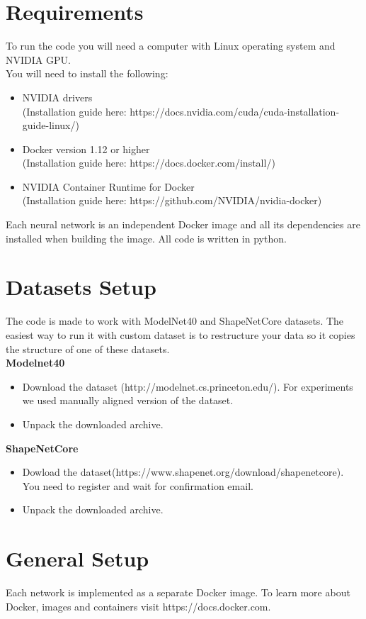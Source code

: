 \section{Requirements}
To run the code you will need a computer with Linux operating system and NVIDIA GPU. \\

You will need to install the following:
\begin{itemize}
	\item NVIDIA drivers \\(Installation guide here: https://docs.nvidia.com/cuda/cuda-installation-guide-linux/)
	\item Docker version 1.12 or higher \\(Installation guide here: https://docs.docker.com/install/)
	\item NVIDIA Container Runtime for Docker \\(Installation guide here: https://github.com/NVIDIA/nvidia-docker)
\end{itemize}
Each neural network is an independent Docker image and all its dependencies are installed when building the image. All code is written in python.  

\section{Datasets Setup}
The code is made to work with ModelNet40 and ShapeNetCore datasets. The easiest way to run it with custom dataset is to restructure your data so it copies the structure of one of these datasets.\\
\textbf{Modelnet40}
\begin{itemize}
	\item {Download the dataset (http://modelnet.cs.princeton.edu/). For experiments we used manually aligned version of the dataset.}
	\item{Unpack the downloaded archive.}
\end{itemize}
\textbf{ShapeNetCore}
\begin{itemize}
		\item {Dowload the dataset(https://www.shapenet.org/download/shapenetcore). You need to register and wait for confirmation email.}
	\item{Unpack the downloaded archive.}
\end{itemize}

\section{General Setup}
Each network is implemented as a separate Docker image. To learn more about Docker, images and containers visit https://docs.docker.com.

